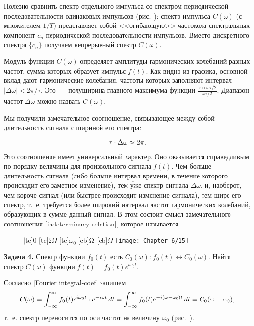 Полезно сравнить спектр отдельного импульса со спектром периодической последовательности одинаковых импульсов (рис.~):
спектр импульса $C(\omega)$ (с множителем $1/T$) представляет собой <<огибающую>> частокола спектральных компонент $c_n$
периодической последовательности импульсов. Вместо дискретного спектра $\{c_n\}$ получаем непрерывный спектр $C(\omega)$.

Модуль функции $C(\omega)$ определяет амплитуды гармонических колебаний разных частот, сумма которых образует импульс
$f(t)$. Как видно из графика, основной вклад дают гармонические колебания, частоты которых заполняют интервал
$|\Delta\omega|<2\pi/\tau$. Это~--- полуширина главного максимума функции
$\frac{\sin\omega\tau/2}{\omega\tau/2}$. Диапазон частот $\Delta\omega$ можно назвать  $C(\omega)$.

Мы получили замечательное соотношение, связывающее между собой длительность сигнала с шириной его спектра:

\begin{equation}
	\eqmark{indeterminacy relation}
	\tau \cdot \Delta\omega \approx 2\pi.
\end{equation}

Это соотношение имеет универсальный характер. Оно оказывается справедливым по порядку величины для произвольного сигнала
$f(t)$. Чем больше длительность сигнала (либо больше интервал времени, в течение которого происходит его заметное
изменение), тем \'уже спектр сигнала $\Delta\omega$, и, наоборот, чем короче сигнал (или быстрее происходит изменение
сигнала), тем шире его спектр, т.~е. требуется более широкий интервал частот гармонических колебаний, образующих в сумме
данный сигнал. В этом состоит смысл замечательного соотношения \eqref{indeterminacy relation}, которое называется .
\begin{figure}[h!]
	[tc]{0}
	[tc]{$2\Omega$}
	[tc]{$\omega_0$}
	[cb]{$\llap{$-$}\Omega$}
	[cb]{$\Omega$}
	\texttt{[image: Chapter\_6/15]}
	\caption{}
\end{figure}

\textbf{Задача 4.} Спектр функции $f_0(t)$ есть $C_0(\omega)$: $f_0(t)\leftrightarrow C_0(\omega)$. Найти спектр $C(\omega)$ функции $f(t)=f_0(t)e^{i\omega_0t}$.

Согласно \eqref{Fourier integral-coef} запишем
\begin{equation}
	\eqmark{task-spectrum-shift}
	C(\omega)=\int_{-\infty}^\infty f_0(t)e^{i\omega_0 t}\cdot e^{-i\omega t}\,dt=\int_{-\infty}^\infty
f_0(t)e^{-i(\omega-\omega_0)t}\,dt=C_0(\omega-\omega_0),
\end{equation}
т.~е. спектр переносится по оси частот на величину $\omega_0$ (рис.~).


